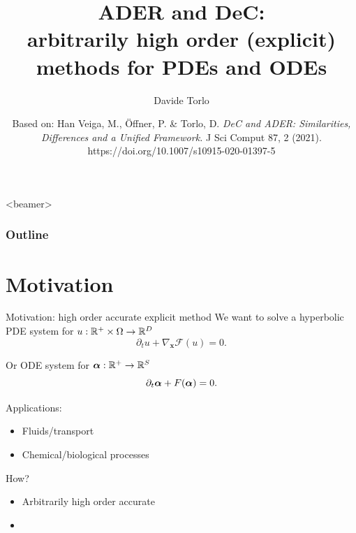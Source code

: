 \documentclass[aspectratio=169]{beamer}
\title[ADER vs DeC]{ADER and DeC: \\ arbitrarily high order (explicit)\\ methods for PDEs and ODEs}
\author[D. Torlo]{Davide Torlo}
\institute[Inria]
{Inria Bordeaux - Sud Ouest\\
Team Cardamom}
\date[]
{\small Based on: Han Veiga, M., Öffner, P. \& Torlo, D. \textit{DeC and ADER: Similarities, Differences and a Unified Framework.} J Sci Comput 87, 2 (2021). https://doi.org/10.1007/s10915-020-01397-5
}
\begin{document}
\begin{frame}

\titlepage



\end{frame}

\begin{frame}<beamer>
	\frametitle{Outline}
	  \tableofcontents
\end{frame}

\section{Motivation}

\begin{frame}{Motivation: high order accurate explicit method}
	We want to solve a hyperbolic  PDE system for $u:\mathbb{R}^+\times \Omega \to \mathbb{R}^D$
	\begin{equation}\label{eq:scalarPDE}
		\partial_t u + \nabla_{\mathbf{x}} \mathcal{F}(u) =0.
	\end{equation}

	Or ODE system for $\boldsymbol{\alpha}:\mathbb{R}^+\to \mathbb{R}^S$
	\begin{equation}\label{eq:scalarODE}
		\partial_t \boldsymbol{\alpha} + F(\boldsymbol{\alpha}) =0.
	\end{equation}
	
	Applications:
	\begin{itemize}
		\item Fluids/transport
		\item Chemical/biological processes
	\end{itemize}
	\vspace{5mm}
	
	How?
	\begin{itemize}
		\item Arbitrarily high order accurate
		\item {}
	\end{itemize}
	

\end{frame}
\end{document}
